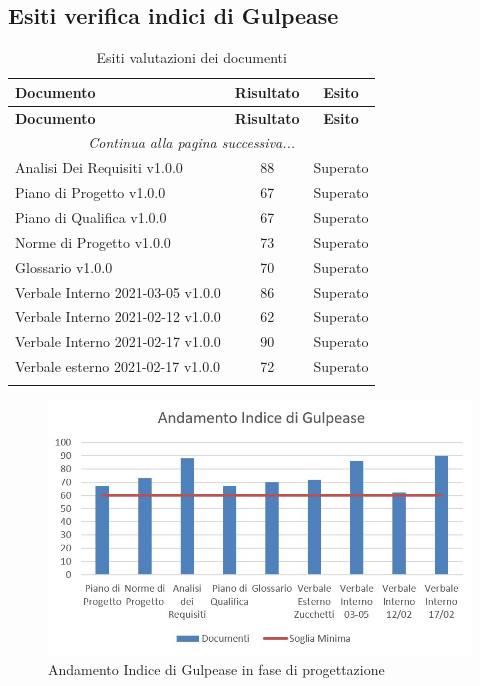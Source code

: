 \documentclass[../piano_di_qualifica.tex]{subfiles}
\begin{document}
\subsection{Esiti verifica indici di Gulpease}
\label{sub:verif_gul}

\begin{center}
	\begin{longtable}{|l|c|c|}
		\hline
		\rowcolor{lightgray}
		\textbf{Documento}                 & \textbf{Risultato} & \textbf{Esito} \\
		\hline
		\endfirsthead
	
		\hline
		\rowcolor{lightgray}
		\textbf{Documento}                 & \textbf{Risultato} & \textbf{Esito} \\
		\hline
		\endhead
		
		\hline
		\multicolumn{3}{|c|}{\emph{Continua alla pagina successiva...}}\\
		\hline
		\endfoot

		\endlastfoot

		Analisi Dei Requisiti v1.0.0       & 88                 & Superato       \\
		Piano di Progetto v1.0.0           & 67                 & Superato       \\
		Piano di Qualifica v1.0.0          & 67                 & Superato       \\
		Norme di Progetto v1.0.0           & 73                 & Superato       \\
		Glossario v1.0.0                   & 70                 & Superato       \\
		Verbale Interno 2021-03-05 v1.0.0  & 86                 & Superato       \\
		Verbale Interno 2021-02-12 v1.0.0  & 62                 & Superato       \\
		Verbale Interno 2021-02-17 v1.0.0  & 90                 & Superato       \\
		Verbale esterno 2021-02-17 v1.0.0  & 72                 & Superato       \\
		\hline
		\caption{Esiti valutazioni dei documenti}
	\end{longtable}
\end{center}
		
\begin{figure}[H]
\centering
\includegraphics[width=12cm]{img/media_gul_RP.jpg}
\caption{ Andamento Indice di Gulpease in fase di progettazione}
\end{figure}
\end{document}
